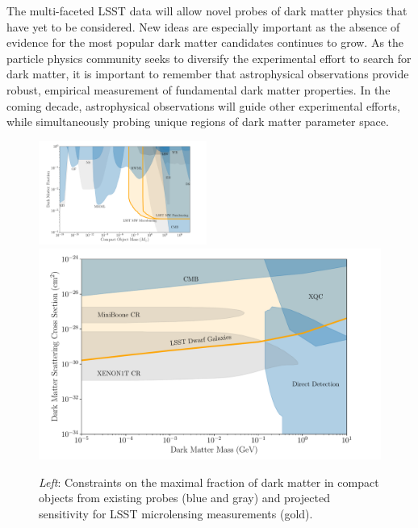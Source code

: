 \documentclass[12pt]{article}
\begin{document}
The multi-faceted LSST data will allow novel probes of dark matter physics that have yet to be considered.
New ideas are especially important as the absence of evidence for the most popular dark matter candidates continues to grow.
As the particle physics community seeks to diversify the experimental effort to search for dark matter, it is important to remember that astrophysical observations provide robust, empirical measurement of fundamental dark matter properties.
In the coming decade, astrophysical observations will guide other experimental efforts, while simultaneously probing unique regions of dark matter parameter space.



\begin{figure}[t]
\centering
\includegraphics[width=0.49\textwidth]{figures/macho_limits.pdf}
\includegraphics[width=0.49\columnwidth]{figures/bsdm_limits.pdf}
\caption{\label{fig:macho_constraints}
    \emph{Left}: Constraints on the maximal fraction of dark matter in compact objects from existing probes (blue and gray) and projected sensitivity for LSST microlensing measurements (gold).
}
\end{figure}
\end{document}
